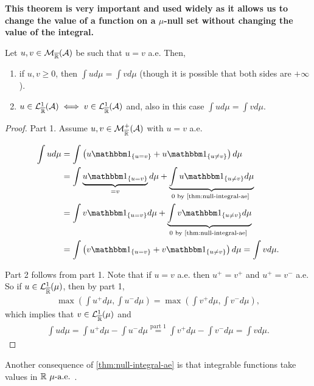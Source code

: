 \textbf{This theorem is very important and used widely as it allows us to change the value of a function on a $\mu$-null set without changing the value of the integral.}

\begin{cor}
	Let $u, v \in \mathcal{M}_{\overline{\mathbb{R}}}(\mathcal{A})$ be such that $u = v$ a.e. Then,
	\begin{enumerate}
		\item if $u, v \geq 0$, then $\int u d\mu = \int v d\mu$ (though it is possible that both sides are $+\infty$).
		\item $u \in \mathcal{L}^1_{\overline{\mathbb{R}}}(\mathcal{A}) \iff v \in \mathcal{L}_{\overline{\mathbb{R}}}^1(\mathcal{A})$ and, also in this case $\int u d\mu = \int v d\mu$.
	\end{enumerate}
\end{cor}

\begin{proof}
	Part 1. Assume $u, v \in \mathcal{M}_{\overline{\mathbb{R}}}^+(\mathcal{A})$ with $u = v$ a.e.
	
	\begin{align*}
		\int u d\mu
		&= \int \left( u \ind_{\{u = v\}} + u \ind_{\{u \neq v\}} \right)d\mu \\
		&= \int \underbrace{u \ind_{\{u = v\}}}_{= v} d\mu + \underbrace{\int u \ind_{\{u \neq v\}} d\mu}_{0 \text{ by \autoref{thm:null-integral-ae} }} \\
		&= \int v \ind_{\{u = v\}} d\mu + \underbrace{\int v \ind_{\{u \neq v\}} d\mu}_{0 \text{ by \autoref{thm:null-integral-ae} }} \\
		&= \int \left( v \ind_{\{u = v\}} + v \ind_{\{u \neq v\}} \right)d\mu
		= \int v d\mu.
	\end{align*}
	
	Part 2 follows from part 1. Note that if $u = v$ a.e. then $u^+ = v^+$ and $u^+ = v^-$ a.e. So if $u \in \mathcal{L}_{\overline{\mathbb{R}}}^1(\mu)$, then by part 1,
	\begin{align*}
		\max\left(\int u^+d\mu, \int u^-d\mu\right) = \max \left( \int v^+ d\mu, \int v^- d\mu \right), 
	\end{align*}
	which implies that $v \in \mathcal{L}^1_{\overline{\mathbb{R}}}(\mu)$ and
	\begin{align*}
		\int u d\mu
		= \int u^+ d\mu - \int u^- d\mu
		\overset{\text{part 1}}{=} \int v^+d\mu - \int v^- d\mu
		= \int v d\mu.
	\end{align*}
\end{proof}

Another consequence of \autoref{thm:null-integral-ae} is that integrable functions take values in $\mathbb{R} \ \mu\text{-a.e. }$.


